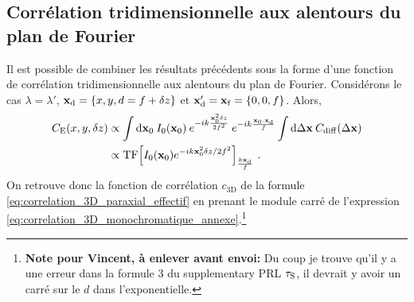 \subsection{Corrélation tridimensionnelle aux alentours du plan de Fourier}
Il est possible de combiner les résultats précédents sous la forme d'une fonction de corrélation tridimensionnelle aux alentours du plan de Fourier. Considérons le cas $\lambda=\lambda'$, $\mathbf{x}_{\mathrm{d}}=\lbrace x,y,d=f+\delta z\rbrace$ et $\mathbf{x}_{\mathrm{d}}'=\mathbf{x}_{\mathrm{f}}=\lbrace 0,0,f \rbrace$. Alors, 
\begin{align}
C_{\mathrm{E}}(x,y,\delta z)&\propto \int{\mathop{}\mathopen{}\mathrm{d}\mathbf{x}_0\: I_0(\mathbf{x}_0) \: e^{-ik \frac{\mathbf{x}_0^2 \delta z}{2 f^2}} \: e^{-ik \frac{\mathbf{x}_0.\mathbf{x}_{\mathrm{d}}}{f}}} \int{\mathop{}\mathopen{}\mathrm{d}\Delta\mathbf{x}\: C_{\mathrm{diff}}(\Delta\mathbf{x})}\\
&\propto \mathrm{TF}{\left[ I_0(\mathbf{x}_0) e^{-ik\mathbf{x}_0^2 \delta z/2f^2} \right]}_{\frac{k\mathbf{x}_{\mathrm{d}}}{f}} \text{ .}
\label{eq:correlation_3D_monochromatique_annexe}
\end{align}
On retrouve donc la fonction de corrélation $c_{\mathrm{3D}}$ de la formule \ref{eq:correlation_3D_paraxial_effectif} en prenant le module carré de l'expression \ref{eq:correlation_3D_monochromatique_annexe}.\footnote{\textbf{Note pour Vincent, à enlever avant envoi:} Du coup je trouve qu'il y a une erreur dans la formule 3 du supplementary PRL $\tau_{\mathrm{S}}$, il devrait y avoir un carré sur le $d$ dans l'exponentielle.}











